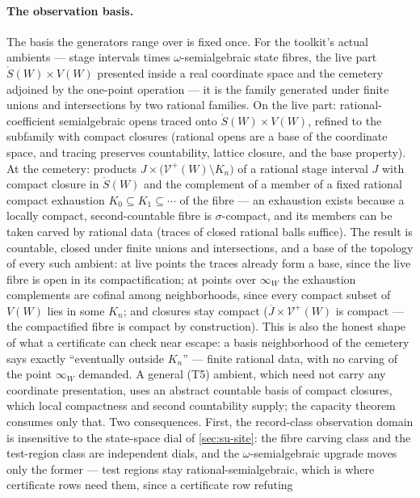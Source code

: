 \paragraph{The observation basis.} The basis the generators range
over is fixed once. For the toolkit's actual ambients --- stage
intervals times $\omega$-semialgebraic state fibres, the live part
$\mathring{S}(W) \times V(W)$ presented inside a real coordinate
space and the cemetery adjoined by the one-point operation --- it is
the family generated under finite unions and intersections by two
rational families. On the live part: rational-coefficient
semialgebraic opens traced onto $\mathring{S}(W) \times V(W)$,
refined to the subfamily with compact closures (rational opens are a
base of the coordinate space, and tracing preserves countability,
lattice closure, and the base property). At the cemetery: products
$J \times \bigl(\mathcal{V}^{+}(W) \setminus K_n\bigr)$ of a rational
stage interval $J$ with compact closure in $\mathring{S}(W)$ and the
complement of a member of a fixed rational compact exhaustion
$K_0 \subseteq K_1 \subseteq \cdots$ of the fibre --- an exhaustion
exists because a locally compact, second-countable fibre is
$\sigma$-compact, and its members can be taken carved by rational
data (traces of closed rational balls suffice). The result is
countable, closed under finite unions and intersections, and a base
of the topology of every such ambient: at live points the traces
already form a base, since the live fibre is open in its
compactification; at points over $\infty_W$ the exhaustion
complements are cofinal among neighborhoods, since every compact
subset of $V(W)$ lies in some $K_n$; and closures stay compact
($\overline{J} \times \mathcal{V}^{+}(W)$ is compact --- the
compactified fibre is compact by construction). This is also the
honest shape of what a certificate can check near escape: a basis
neighborhood of the cemetery says exactly ``eventually outside
$K_n$'' --- finite rational data, with no carving of the point
$\infty_W$ demanded. A general (T5)
ambient, which need not carry any coordinate presentation, uses an
abstract countable basis of compact closures, which local compactness
and second countability supply; the capacity theorem consumes only
that. Two consequences. First, the record-class observation domain is
insensitive to the state-space dial of \autoref{sec:su-site}:
the fibre carving class and the test-region class are independent
dials, and the $\omega$-semialgebraic upgrade moves only the former
--- test regions stay rational-semialgebraic, which is where
certificate rows need them, since a certificate row refuting
